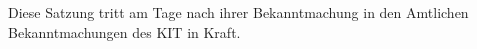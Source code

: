 \begin{contract}
\label{grundsaetze:inkrafttreten}
\parnumberfalse Diese Satzung tritt am Tage nach ihrer Bekanntmachung in den Amtlichen Bekanntmachungen des KIT in Kraft.\parnumbertrue


\end{contract}
